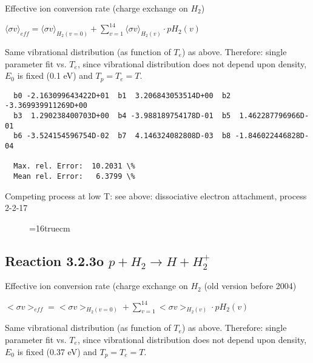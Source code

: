 \documentclass[12pt,dvipdfmx]{article}
\begin{document}
  Effective ion conversion rate (charge exchange on $H_2$)

  $ \langle\sigma v \rangle_{eff} = \langle\sigma v \rangle_{H_2(v=0)} + \sum_{v=1}^{14}
\langle\sigma v \rangle_{H_2(v)} \cdot pH_2(v) $

  Same vibrational distribution (as function of $T_e$) as above.
  Therefore:
  single parameter fit vs. $T_e$,
  since vibrational distribution does not depend upon density, $E_0$ is fixed
  (0.1 eV) and $T_p = T_e = T$.

\begin{small}\begin{verbatim}
  b0 -2.163099643422D+01  b1  3.206843053514D+00  b2 -3.369939911269D+00
  b3  1.290238400703D+00  b4 -3.988189754178D-01  b5  1.462287796966D-01
  b6 -3.524154596754D-02  b7  4.146324082808D-03  b8 -1.846022446828D-04

  Max. rel. Error:  10.2031 \%
  Mean rel. Error:   6.3799 \%

\end{verbatim}\end{small}
Competing process at low T: see above: dissociative electron attachment, process 2-2-17
\begin{figure} \label{3.2.3}
\epsfxsize=16truecm
\end{figure}



\newpage

\subsection{
Reaction 3.2.3o   $p + H_2 \rightarrow H + H_2^+  $}

  Effective ion conversion rate (charge exchange on $H_2$ (old version before 2004)

  $ <\sigma v>_{eff} = <\sigma v>_{H_2(v=0)} + \sum_{v=1}^{14}
<\sigma v>_{H_2(v)} \cdot pH_2(v) $

  Same vibrational distribution (as function of $T_e$) as above.
  Therefore:
  single parameter fit vs. $T_e$,
  since vibrational distribution does not depend upon density, $E_0$ is fixed
  (0.37 eV) and $T_p = T_e = T$.
\end{document}
